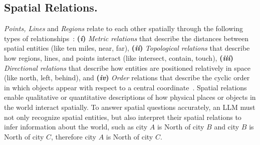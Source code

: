 \subsection{Spatial Relations.}
\textit{Points, Lines} and \textit{Regions} relate to each other spatially through the following types of relationships~\cite{Carniel2020,Bertella2022,Carniel2023}: 
\textbf{(\textit{i})} \textit{Metric relations} that describe the distances between spatial entities (like ten miles, near, far), 
\textbf{(\textit{ii})} \textit{Topological relations} that describe how regions, lines, and points interact (like intersect, contain, touch), 
\textbf{(\textit{iii})} \textit{Directional relations} that describe how entities are positioned relatively in space (like north, left, behind), and
\textbf{(\textit{iv})} \textit{Order} relations that describe the cyclic order in which objects appear with respect to a central coordinate~\cite{Schwering2014}.
%
Spatial relations enable qualitative or quantitative descriptions of how physical places or objects in the world interact spatially.
To answer spatial questions accurately, an LLM must not only recognize spatial entities, but also interpret their spatial relations to infer information about the world, such as city $A$ is North of city $B$ and city $B$ is North of city $C$, therefore city $A$ is North of city $C$.







